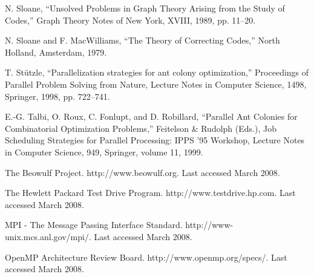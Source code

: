 \documentclass[11pt]{article}
\begin{document}
\begin{thebibliography}{99}
N. Sloane, ``Unsolved Problems in Graph Theory Arising from the Study of Codes,'' Graph Theory Notes of New York, XVIII, 1989, pp. 11--20.


N. Sloane and F. MacWilliams, ``The Theory of Correcting Codes,'' North Holland, Amsterdam, 1979.

T. St\"utzle, ``Parallelization strategies for ant colony optimization,'' Proceedings of Parallel Problem Solving from Nature, Lecture Notes in Computer Science, 1498, Springer, 1998, pp. 722--741.



E.-G. Talbi, O. Roux, C. Fonlupt, and D. Robillard, ``Parallel Ant Colonies for Combinatorial Optimization Problems,'' Feitelson 
\& Rudolph (Eds.), Job Scheduling Strategies for Parallel Processing: IPPS ’95 Workshop, Lecture Notes in Computer Science, 949, Springer, volume 11, 1999.


The Beowulf Project. http://www.beowulf.org. Last accessed March 2008.

The Hewlett Packard Test Drive Program. http://www.testdrive.hp.com. Last accessed March 2008.


MPI - The Message Passing Interface Standard. http://www-unix.mcs.anl.gov/mpi/. Last accessed March 2008.


OpenMP Architecture Review Board. http://www.openmp.org/specs/. Last accessed March 2008.

\end{thebibliography}
\end{document}
